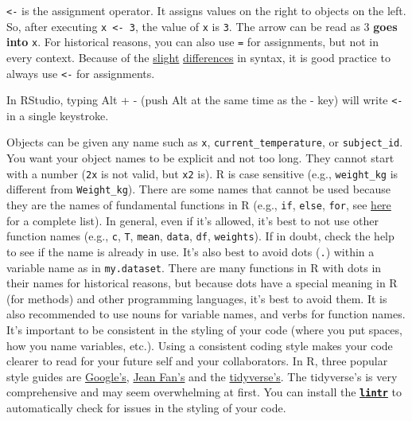 \documentclass[]{book}
\theoremstyle{definition}
\theoremstyle{definition}
\theoremstyle{remark}
\begin{document}
\texttt{\textless{}-} is the assignment operator. It assigns values on
the right to objects on the left. So, after executing
\texttt{x\ \textless{}-\ 3}, the value of \texttt{x} is \texttt{3}. The
arrow can be read as 3 \textbf{goes into} \texttt{x}. For historical
reasons, you can also use \texttt{=} for assignments, but not in every
context. Because of the
\href{http://blog.revolutionanalytics.com/2008/12/use-equals-or-arrow-for-assignment.html}{slight}
\href{https://web.archive.org/web/20130610005305/https://stat.ethz.ch/pipermail/r-help/2009-March/191462.html}{differences}
in syntax, it is good practice to always use \texttt{\textless{}-} for
assignments.

In RStudio, typing Alt + - (push Alt at the same time as the - key) will
write \texttt{\textless{}-} in a single keystroke.

Objects can be given any name such as \texttt{x},
\texttt{current\_temperature}, or \texttt{subject\_id}. You want your
object names to be explicit and not too long. They cannot start with a
number (\texttt{2x} is not valid, but \texttt{x2} is). R is case
sensitive (e.g., \texttt{weight\_kg} is different from
\texttt{Weight\_kg}). There are some names that cannot be used because
they are the names of fundamental functions in R (e.g., \texttt{if},
\texttt{else}, \texttt{for}, see
\href{https://stat.ethz.ch/R-manual/R-devel/library/base/html/Reserved.html}{here}
for a complete list). In general, even if it's allowed, it's best to not
use other function names (e.g., \texttt{c}, \texttt{T}, \texttt{mean},
\texttt{data}, \texttt{df}, \texttt{weights}). If in doubt, check the
help to see if the name is already in use. It's also best to avoid dots
(\texttt{.}) within a variable name as in \texttt{my.dataset}. There are
many functions in R with dots in their names for historical reasons, but
because dots have a special meaning in R (for methods) and other
programming languages, it's best to avoid them. It is also recommended
to use nouns for variable names, and verbs for function names. It's
important to be consistent in the styling of your code (where you put
spaces, how you name variables, etc.). Using a consistent coding style
makes your code clearer to read for your future self and your
collaborators. In R, three popular style guides are
\href{https://google.github.io/styleguide/Rguide.xml}{Google's},
\href{http://jef.works/R-style-guide/}{Jean Fan's} and the
\href{http://style.tidyverse.org/}{tidyverse's}. The tidyverse's is very
comprehensive and may seem overwhelming at first. You can install the
\href{https://github.com/jimhester/lintr}{\textbf{\texttt{lintr}}} to
automatically check for issues in the styling of your code.
\end{document}
